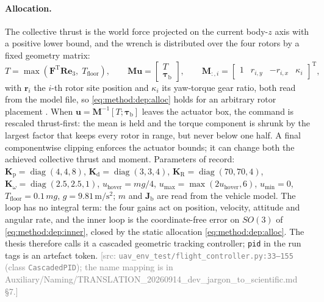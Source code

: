 \documentclass[headsepline,footsepline,footinclude=false,oneside,fontsize=11pt,paper=a4,listof=totoc,bibliography=totoc]{scrbook}
\theoremstyle{definition}
\theoremstyle{plain}
\theoremstyle{remark}
\newcommand{\vect}[1]{\boldsymbol{#1}}
\newcommand{\matr}[1]{\boldsymbol{#1}}
\newcommand{\trans}{^{\textrm{T}}}
\newcommand{\sidx}[1]{_{\textrm{#1}}}
\newcommand{\unitvec}[1]{\textbf{e}_{#1}}
\newif\ifsubmission
\newcommand{\srcnote}[1]{\ifsubmission\else\textcolor{gray}{\footnotesize\textsf{[src: #1]}}\fi}
\begin{document}
\paragraph{Allocation.} The collective thrust is the world force projected on the current body-$z$
axis with a positive lower bound, and the wrench is distributed over the
four rotors by a fixed geometry matrix:
\begin{equation}\label{eq:method:dep:alloc}
  T = \max\!\left(\vect{F}\trans\matr{R}\unitvec{3},\;T\sidx{floor}\right),
  \qquad
  \matr{M}\vect{u} = \begin{bmatrix}T\\ \vect{\tau}\sidx{b}\end{bmatrix},
  \qquad
  \matr{M}_{:,i} = \begin{bmatrix}1 & r_{i,y} & -r_{i,x} & \kappa_{i}\end{bmatrix}\trans,
\end{equation}
with $\vect{r}_{i}$ the $i$-th rotor site position and $\kappa_{i}$ its yaw-torque gear ratio, both
read from the model file, so \eqref{eq:method:dep:alloc} holds for an arbitrary rotor placement
\parencite[Eq.~(1)]{lee2010geometric}\parencite{mellinger2011minimum}. When
$\vect{u} = \matr{M}^{-1}[T;\vect{\tau}\sidx{b}]$ leaves the actuator box, the command is rescaled
thrust-first: the mean is held and the torque component is shrunk by the largest factor that keeps
every rotor in range, but never below one half. A final componentwise clipping enforces the actuator
bounds; it can change both the achieved collective thrust and moment. Parameters of record:
$\matr{K}\sidx{p} = \operatorname{diag}(4,4,8)$, $\matr{K}\sidx{d} = \operatorname{diag}(3,3,4)$,
$\matr{K}\sidx{R} = \operatorname{diag}(70,70,4)$, $\matr{K}_{\omega} = \operatorname{diag}(2.5,2.5,1)$,
$u\sidx{hover} = mg/4$, $u\sidx{max} = \max(2u\sidx{hover},6)$, $u\sidx{min} = 0$,
$T\sidx{floor} = 0.1\,mg$, $g = 9.81\,\textrm{m}/\textrm{s}^{2}$; $m$ and $\matr{J}\sidx{b}$ are
read from the vehicle model.
The loop has no integral term: the four gains act on position, velocity, attitude and angular rate,
and the inner loop is the coordinate-free error on $SO(3)$ of \eqref{eq:method:dep:inner}, closed by
the static allocation \eqref{eq:method:dep:alloc}. The thesis therefore calls it a cascaded geometric
tracking controller; \texttt{pid} in the run tags is an artefact token.
\srcnote{\texttt{uav\_env\_test/flight\_controller.py:33--155} (class \texttt{CascadedPID}); the name
mapping is in Auxiliary/Naming/TRANSLATION\_20260914\_dev\_jargon\_to\_scientific.md \S7.}
\end{document}
